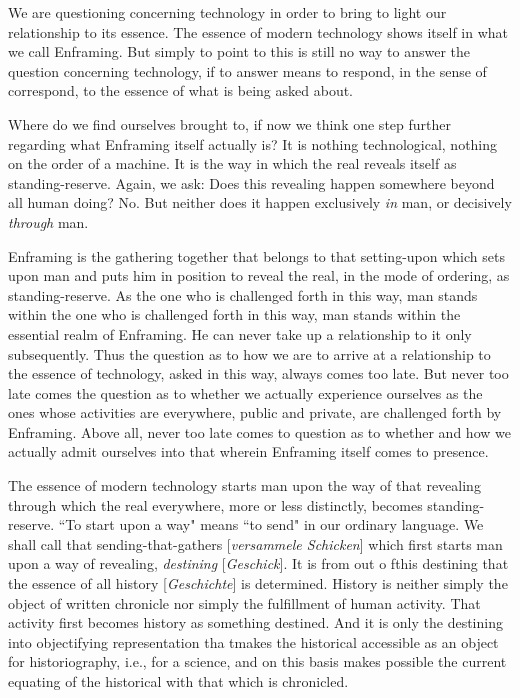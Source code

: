 We are questioning concerning technology in order to bring to light our relationship to its essence. The essence of modern technology shows itself in what we call Enframing. But simply to point to this is still no way to answer the question concerning technology, if to answer means to respond, in the sense of correspond, to the essence of what is being asked about.

Where do we find ourselves brought to, if now we think one step further regarding what Enframing itself actually is? It is nothing technological, nothing on the order of a machine. It is the way in which the real reveals itself as standing-reserve. Again, we ask: Does this revealing happen somewhere beyond all human doing? No. But neither does it happen exclusively \textit{in} man, or decisively \textit{through} man.

Enframing is the gathering together that belongs to that setting-upon which sets upon man and puts him in position to reveal the real, in the mode of ordering, as standing-reserve. As the one who is challenged forth in this way, man stands within the one who is challenged forth in this way, man stands within the essential realm of Enframing. He can never take up a relationship to it only subsequently. Thus the question as to how we are to arrive at a relationship to the essence of technology, asked in this way, always comes too late. But never too late comes the question as to whether we actually experience ourselves as the ones whose activities are everywhere, public and private, are challenged forth by Enframing. Above all, never too late comes to question as to whether and how we actually admit ourselves into that wherein Enframing itself comes to presence.

The essence of modern technology starts man upon the way of that revealing through which the real everywhere, more or less distinctly, becomes standing-reserve. ``To start upon a way" means ``to send" in our ordinary language. We shall call that sending-that-gathers [\textit{versammele Schicken}] which first starts man upon a way of revealing, \textit{destining} [\textit{Geschick}]. It is from out o fthis destining that the essence of all history [\textit{Geschichte}] is determined. History is neither simply the object of written chronicle nor simply the fulfillment of human activity. That activity first becomes history as something destined. And it is only the destining into objectifying representation tha tmakes the historical accessible as an object for historiography, i.e., for a science, and on this basis makes possible the current equating of the historical with that which is chronicled.


